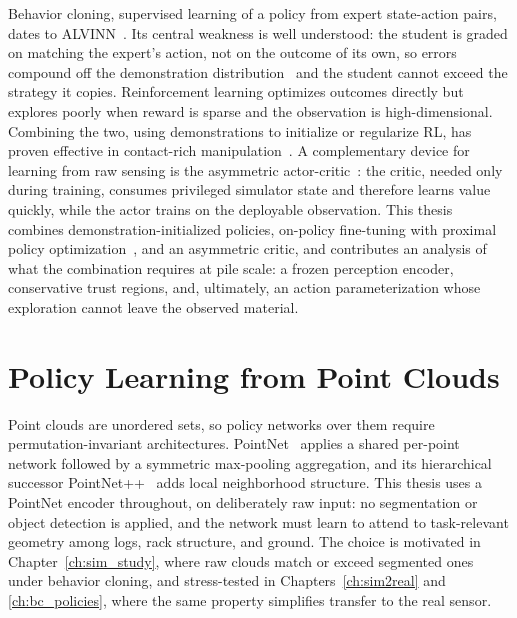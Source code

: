 Behavior cloning, supervised learning of a policy from expert
state-action pairs, dates to ALVINN~\cite{pomerleau1988alvinn}. Its central
weakness is well understood: the student is graded on matching the expert's
action, not on the outcome of its own, so errors compound off the
demonstration distribution~\cite{ross2011dagger} and the student cannot exceed
the strategy it copies. Reinforcement learning optimizes outcomes directly but
explores poorly when reward is sparse and the observation is high-dimensional.
Combining the two, using demonstrations to initialize or regularize RL, has
proven effective in contact-rich manipulation~\cite{rajeswaran2018learning,
nair2018overcoming}. A complementary device for learning from raw sensing is
the asymmetric actor-critic~\cite{pinto2018asymmetric}: the critic, needed
only during training, consumes privileged simulator state and therefore learns
value quickly, while the actor trains on the deployable observation. This
thesis combines demonstration-initialized policies, on-policy fine-tuning with
proximal policy optimization~\cite{schulman2017ppo, schwarke2025rslrl}, and an
asymmetric critic, and contributes an analysis of what the combination
requires at pile scale: a frozen perception encoder, conservative trust
regions, and, ultimately, an action parameterization whose exploration cannot
leave the observed material.

\section{Policy Learning from Point Clouds}

Point clouds are unordered sets, so policy networks over them require
permutation-invariant architectures. PointNet~\cite{qi2017pointnet} applies a
shared per-point network followed by a symmetric max-pooling aggregation, and
its hierarchical successor PointNet++~\cite{qi2017pointnetplusplus} adds local
neighborhood structure. This thesis uses a PointNet encoder throughout, on
deliberately raw input: no segmentation or object detection is applied, and
the network must learn to attend to task-relevant geometry among logs, rack
structure, and ground. The choice is motivated in
Chapter~\ref{ch:sim_study}, where raw clouds match or exceed segmented ones
under behavior cloning, and stress-tested in Chapters~\ref{ch:sim2real} and
\ref{ch:bc_policies}, where the same property simplifies transfer to the real
sensor.
